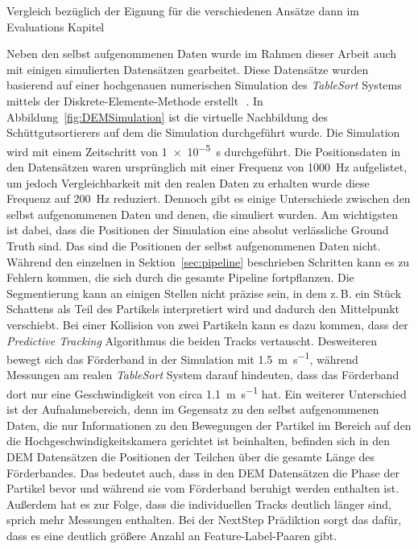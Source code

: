 Vergleich bezüglich der Eignung für die verschiedenen Ansätze dann im Evaluations Kapitel
\color{black}

Neben den selbst aufgenommenen Daten wurde im Rahmen dieser Arbeit auch mit einigen simulierten Datensätzen gearbeitet.
Diese Datensätze wurden basierend auf einer hochgenauen numerischen Simulation des \textit{TableSort} Systems mittels der Diskrete-Elemente-Methode erstellt~\cite{pieper2016numerical}\,\cite{pieper2017numerical}.
In Abbildung~\ref{fig:DEMSimulation} ist die virtuelle Nachbildung des Schüttgutsortierers auf dem die Simulation durchgeführt wurde.
Die Simulation wird mit einem Zeitschritt von \SI{1e-5}{\second} durchgeführt.
Die Positionsdaten in den Datensätzen waren ursprünglich mit einer Frequenz von \SI{1000}{\hertz} aufgelistet,
um jedoch Vergleichbarkeit mit den realen Daten zu erhalten wurde diese Frequenz auf \SI{200}{\hertz} reduziert.
Dennoch gibt es einige Unterschiede zwischen den selbst aufgenommenen Daten und denen, die simuliert wurden.
Am wichtigsten ist dabei, dass die Positionen der Simulation eine absolut verlässliche Ground Truth sind.
Das sind die Positionen der selbst aufgenommenen Daten nicht.
Während den einzelnen in Sektion~\ref{sec:pipeline} beschrieben Schritten kann es zu Fehlern kommen, die sich durch die gesamte Pipeline fortpflanzen.
Die Segmentierung kann an einigen Stellen nicht präzise sein, in dem z.\,B. ein Stück Schattens als Teil des Partikels interpretiert wird und dadurch den Mittelpunkt verschiebt. 
Bei einer Kollision von zwei Partikeln kann es dazu kommen, dass der \textit{Predictive Tracking} Algorithmus die beiden Tracks vertauscht.  
Desweiteren bewegt sich das Förderband in der Simulation mit \SI{1.5}{\meter\per\second}, 
während Messungen am realen \textit{TableSort} System darauf hindeuten, dass das Förderband dort nur eine Geschwindigkeit von 
circa \SI{1.1}{\meter\per\second} hat.
Ein weiterer Unterschied ist der Aufnahmebereich, denn im Gegensatz zu den selbst aufgenommenen Daten, die nur Informationen 
zu den Bewegungen der Partikel im Bereich auf den die Hochgeschwindigkeitskamera gerichtet ist beinhalten, 
befinden sich in den DEM Datensätzen die Positionen der Teilchen über die gesamte Länge des Förderbandes.
Das bedeutet auch, dass in den DEM Datensätzen die Phase der Partikel bevor und während sie vom Förderband beruhigt werden enthalten ist.
Außerdem hat es zur Folge, dass die individuellen Tracks deutlich länger sind, sprich mehr Messungen enthalten.
Bei der NextStep Prädiktion sorgt das dafür, dass es eine deutlich größere Anzahl an Feature-Label-Paaren gibt.


